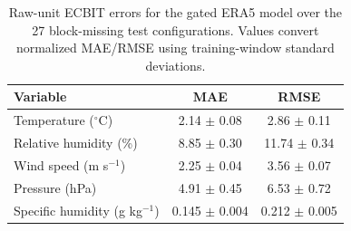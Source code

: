 \begin{table}[t]
  \centering
  \caption{Raw-unit ECBIT errors for the gated ERA5 model over the 27 block-missing test configurations. Values convert normalized MAE/RMSE using training-window standard deviations.}
  \label{tab:raw-unit-errors}
  \begin{tabular}{lcc}
    \toprule
    Variable & MAE & RMSE \\
    \midrule
    Temperature ($^\circ$C) & 2.14 $\pm$ 0.08 & 2.86 $\pm$ 0.11 \\
    Relative humidity (\%) & 8.85 $\pm$ 0.30 & 11.74 $\pm$ 0.34 \\
    Wind speed (m s$^{-1}$) & 2.25 $\pm$ 0.04 & 3.56 $\pm$ 0.07 \\
    Pressure (hPa) & 4.91 $\pm$ 0.45 & 6.53 $\pm$ 0.72 \\
    Specific humidity (g kg$^{-1}$) & 0.145 $\pm$ 0.004 & 0.212 $\pm$ 0.005 \\
    \bottomrule
  \end{tabular}
\end{table}
